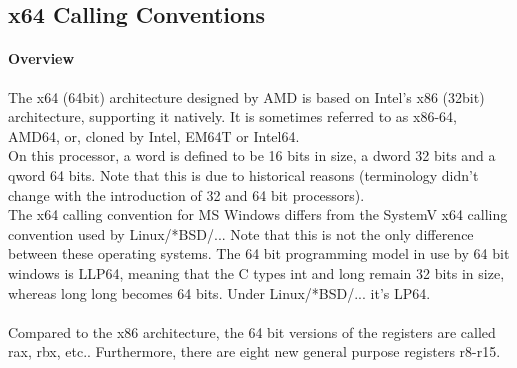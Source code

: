 %
%
%
%

\subsection{x64 Calling Conventions}


\paragraph{Overview}

The x64 (64bit) architecture designed by AMD is based on Intel's x86 (32bit)
architecture, supporting it natively. It is sometimes referred to as x86-64,
AMD64, or, cloned by Intel, EM64T or Intel64.\\
On this processor, a word is defined to be 16 bits in size, a dword 32 bits
and a qword 64 bits. Note that this is due to historical reasons (terminology
didn't change with the introduction of 32 and 64 bit processors).\\
The x64 calling convention for MS Windows \cite{x64Win} differs from the
SystemV x64 calling convention \cite{x64SysV} used by Linux/*BSD/...
Note that this is not the only difference between these operating systems. The
64 bit programming model in use by 64 bit windows is LLP64, meaning that the C
types int and long remain 32 bits in size, whereas long long becomes 64 bits.
Under Linux/*BSD/... it's LP64.\\
\\
Compared to the x86 architecture, the 64 bit versions of the registers are
called rax, rbx, etc.. Furthermore, there are eight new general purpose
registers r8-r15.\\



